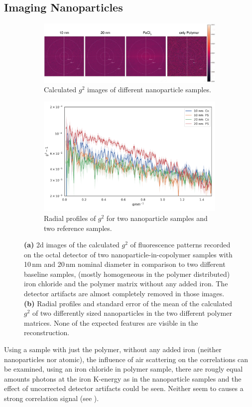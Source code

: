 \subsection{Imaging Nanoparticles}
\begin{figure}
	\centering
	\begin{subfigure}[b]{0.8\textwidth}
		\includegraphics[width=\linewidth]{images/resultnano2dr.pdf}
		\caption{Calculated $g^2$ images of different nanoparticle samples.}
		\label{fig:resnanor2d}
	\end{subfigure}
	\begin{subfigure}[b]{0.8\textwidth}
		\includegraphics[width=\linewidth]{images/resultnano.pdf}
		\caption{Radial profiles of $g^2$ for two nanoparticle samples and two reference samples.}
		\label{fig:resnanorad}
	\end{subfigure}
	\caption[Results Nanoparticles]{\textbf{(a)} 2d images of the calculated $g^2$ of fluorescence patterns recorded on the octal detector of two nanoparticle-in-copolymer samples with 10\,nm and 20\,nm nominal diameter in comparison to two different baseline samples, (mostly homogeneous in the polymer distributed) iron chloride and the polymer matrix without any added iron. The detector artifacts are almost completely removed in those images. \textbf{(b)} Radial profiles and standard error of the mean of the calculated $g^2$ of two differently sized nanoparticles in the two different polymer matrices. None of the expected features are visible in the reconstruction. }
	\label{fig:resnano}
\end{figure}
Using a sample with just the polymer, without any added iron (neither nanoparticles nor atomic), the influence of air scattering on the correlations can be examined, using an iron chloride in polymer sample, there are rougly equal amounts photons at the iron K-energy as in the nanoparticle samples and the effect of uncorrected detector artifacts could be seen. Neither seem to causes a strong correlation signal (see ). 
